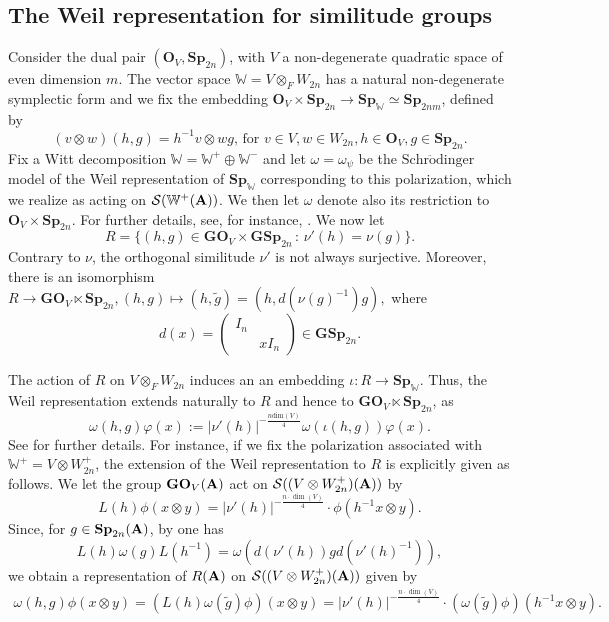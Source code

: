\documentclass[11pt, reqno]{amsart}
\theoremstyle{plain}
\theoremstyle{definition}
\theoremstyle{remark}
\theoremstyle{plain}
\def\A{{\bf A}}
\def\GSp{{\mathbf{GSp}}}
\def\Sp{{\mathbf{Sp}}}
\def\GO{{\mathbf{GO}}}
\begin{document}
 \subsection{The Weil representation for similitude groups}\label{subsec_weil_rep}

Consider the dual pair $(\mathbf{O}_V , \Sp_{2n})$, with $V$ a non-degenerate quadratic space of even dimension $m$. The vector space $\mathbb{W} = V\otimes_F W_{2n} $ has a natural non-degenerate symplectic form and we fix the embedding $\mathbf{O}_V \times \Sp_{2n} \to \Sp_{\mathbb{W}} \simeq \Sp_{2nm}$, defined by 
$$ (v \otimes w) (h,g) = h^{-1}v \otimes  w g,\, \text{for } v \in V, w \in W_{2n}, h \in \mathbf{O}_V, g \in \Sp_{2n}.$$
Fix a Witt decomposition $\mathbb{W} = \mathbb{W}^+ \oplus \mathbb{W}^-$ and let $\omega = \omega_\psi$ be the $\mathrm{Schr\ddot{o}dinger}$ model of the Weil representation of $\Sp_{\mathbb{W}}$ corresponding to this polarization, which we realize as acting on $\mathcal{S}( \mathbb{W}^+(\A))$. We then let $\omega$ denote also its restriction to $\mathbf{O}_V \times \Sp_{2n}$. For further details, see, for instance, \cite{Prasad:Theta:Survey}. 
We now let
\[ R = \{ (h,g)\in \mathbf{GO}_V \times \GSp_{2n} \,:\, \nu'(h) = \nu(g)\}.\]
Contrary to $\nu$, the orthogonal similitude $\nu'$ is not always surjective. Moreover, there is an isomorphism $R \to \GO_V \ltimes \Sp_{2n}, (h,g) \mapsto (h, \tilde{g}) = (h, d(\nu(g)^{-1}) g) ,$ where 
$$d(x) = \left(\begin{smallmatrix}I_n & \\ &xI_n\end{smallmatrix}\right) \in \GSp_{2n}.$$


The action of $R$ on $V\otimes_F W_{2n}$ induces an an embedding $\iota:R\to \Sp_{\mathbb{W}}$. Thus, the Weil representation extends naturally to $R$ and hence to $\GO_V \ltimes \Sp_{2n}$, as 
\[\omega(h,g)\varphi(x) := |\nu'(h)|^{-\frac{n\mathrm{dim}(V)}{4}}\omega(\iota(h,g))\varphi(x).\]
See \cite[\S 3]{RobertsTheta} for further details. For instance, if we fix the polarization associated with $\mathbb{W}^+ = V \otimes W_{2n}^+$, the extension of the Weil representation to $R$ is explicitly given as follows.  We let the group $\GO_V(\A)$ act on $\mathcal{S}((V \otimes W_{2n}^+)(\A))$ by 
\[ L(h) \phi (x \otimes y) = |\nu'(h)|^{-\frac{n \cdot \dim(V)}{4}} \cdot \phi(h^{-1} x  \otimes y).\]
Since, for $g \in \Sp_{2n}(\A)$, by \cite[Lemma 3.2]{RobertsTheta} one has $$L(h) \omega(g) L(h^{-1}) = \omega\left(d(\nu'(h)) g d(\nu'(h)^{-1}) \right),$$ we obtain a representation of $R(\A)$ on $\mathcal{S}((V \otimes W_{2n}^+)(\A))$ given by 
\begin{align}\label{eq_normalization_Weil_similitudes}
    \omega(h,g) \phi(x \otimes y) =  (L(h) \omega( \tilde{g}) \phi)(x \otimes y) =  |\nu'(h)|^{-\frac{n \cdot \dim(V)}{4}} \cdot (\omega( \tilde{g}) \phi)(h^{-1} x \otimes y).
\end{align}
\end{document}
